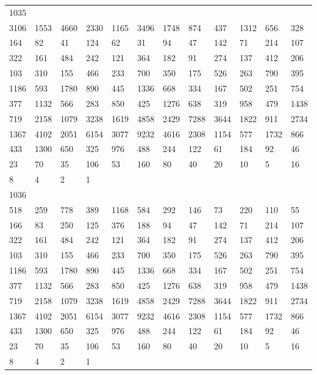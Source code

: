 \begin{longtable}{llllllllllll}
1035&&&&&&&&&&&\\
3106& 1553& 4660& 2330& 1165& 3496& 1748& 874& 437& 1312& 656& 328\\
164& 82& 41& 124& 62& 31& 94& 47& 142& 71& 214& 107\\
322& 161& 484& 242& 121& 364& 182& 91& 274& 137& 412& 206\\
103& 310& 155& 466& 233& 700& 350& 175& 526& 263& 790& 395\\
1186& 593& 1780& 890& 445& 1336& 668& 334& 167& 502& 251& 754\\
377& 1132& 566& 283& 850& 425& 1276& 638& 319& 958& 479& 1438\\
719& 2158& 1079& 3238& 1619& 4858& 2429& 7288& 3644& 1822& 911& 2734\\
1367& 4102& 2051& 6154& 3077& 9232& 4616& 2308& 1154& 577& 1732& 866\\
433& 1300& 650& 325& 976& 488& 244& 122& 61& 184& 92& 46\\
23& 70& 35& 106& 53& 160& 80& 40& 20& 10& 5& 16\\
8& 4& 2& 1& \\

1036&&&&&&&&&&&\\
518& 259& 778& 389& 1168& 584& 292& 146& 73& 220& 110& 55\\
166& 83& 250& 125& 376& 188& 94& 47& 142& 71& 214& 107\\
322& 161& 484& 242& 121& 364& 182& 91& 274& 137& 412& 206\\
103& 310& 155& 466& 233& 700& 350& 175& 526& 263& 790& 395\\
1186& 593& 1780& 890& 445& 1336& 668& 334& 167& 502& 251& 754\\
377& 1132& 566& 283& 850& 425& 1276& 638& 319& 958& 479& 1438\\
719& 2158& 1079& 3238& 1619& 4858& 2429& 7288& 3644& 1822& 911& 2734\\
1367& 4102& 2051& 6154& 3077& 9232& 4616& 2308& 1154& 577& 1732& 866\\
433& 1300& 650& 325& 976& 488& 244& 122& 61& 184& 92& 46\\
23& 70& 35& 106& 53& 160& 80& 40& 20& 10& 5& 16\\
8& 4& 2& 1& \\


\end{longtable}
